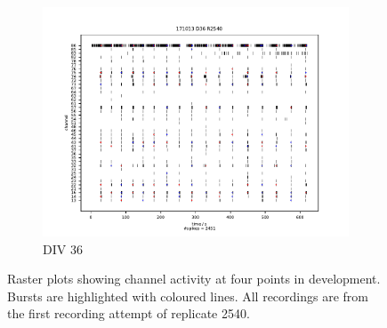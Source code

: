 \documentclass[10pt]{article}
\begin{document}
\begin{figure}[h!]
\ContinuedFloat
\begin{subfigure}{\textwidth}
	\centering
	\includegraphics[width=\textwidth]{../plots/supplementary_figures/burst_plot_4.pdf}
	\caption{DIV 36}
\end{subfigure}
\caption{Raster plots showing channel activity at four points in development. Bursts are highlighted with coloured lines. All recordings are from the first recording attempt of replicate 2540.}
\label{fig:rasters}
\end{figure}
\end{document}
